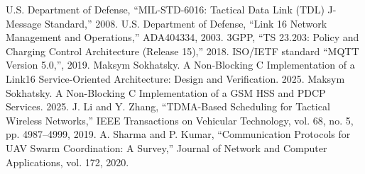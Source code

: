 \documentclass{article}
\begin{document}
\begin{thebibliography}{10}


 U.S. Department of Defense, ``MIL-STD-6016: Tactical Data Link (TDL) J-Message Standard,'' 2008.
 U.S. Department of Defense, ``Link 16 Network Management and Operations,'' ADA404334, 2003.
 3GPP, ``TS 23.203: Policy and Charging Control Architecture (Release 15),'' 2018.
 ISO/IETF standard ``MQTT Version 5.0,'', 2019.
 Maksym Sokhatsky. A Non-Blocking C Implementation of a Link16 Service-Oriented Architecture: Design and Verification. 2025.
 Maksym Sokhatsky. A Non-Blocking C Implementation of a GSM HSS and PDCP Services. 2025.
 J. Li and Y. Zhang, ``TDMA-Based Scheduling for Tactical Wireless Networks,'' IEEE Transactions on Vehicular Technology, vol. 68, no. 5, pp. 4987--4999, 2019.
 A. Sharma and P. Kumar, ``Communication Protocols for UAV Swarm Coordination: A Survey,'' Journal of Network and Computer Applications, vol. 172, 2020.



\end{thebibliography}
\end{document}
